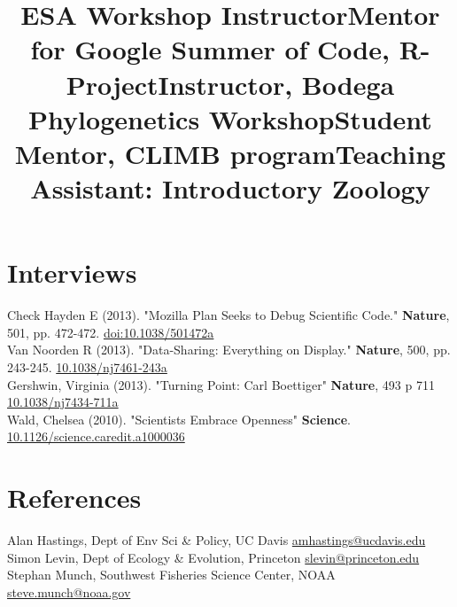 \documentclass[margin]{res}
\begin{document}
\begin{resume}
\title{ESA Workshop Instructor}
\begin{position} \vspace{-.8cm} \end{position}
\title{Mentor for Google Summer of Code, R-Project}
\begin{position} \vspace{-.8cm} \end{position}
\title{Instructor, Bodega Phylogenetics Workshop}
\begin{position} \vspace{-.8cm} \end{position}
\title{Student Mentor, CLIMB program}
\begin{position} \vspace{-.8cm} \end{position}
\title{Teaching Assistant: Introductory Zoology}
 \begin{position} \vspace{-.0cm} \end{position}




\section{Interviews}

Check Hayden E (2013). "Mozilla Plan Seeks to Debug Scientific Code." \textbf{Nature}, 501, pp. 472-472. \href{http://doi.org/10.1038/501472a}{doi:10.1038/501472a} \\ 
Van Noorden R (2013). "Data-Sharing: Everything on Display." \textbf{Nature}, 500, pp. 243-245. \href{http://doi.org/10.1038/nj7461-243a}{10.1038/nj7461-243a} \\
Gershwin, Virginia (2013). "Turning Point: Carl Boettiger" \textbf{Nature}, 493 p 711 \href{http://doi.org/10.1038/nj7434-711a}{10.1038/nj7434-711a} \\
Wald, Chelsea (2010). "Scientists Embrace Openness" \textbf{Science}. \href{http://doi.org/10.1126/science.caredit.a1000036}{10.1126/science.caredit.a1000036} 

\section{References}

Alan Hastings, Dept of Env Sci \& Policy, UC Davis \href{mailto:amhastings@ucdavis.edu}{amhastings@ucdavis.edu} \\ 
Simon Levin, Dept of Ecology \& Evolution, Princeton \href{mailto:slevin@princeton.edu}{slevin@princeton.edu} \\
Stephan Munch, Southwest Fisheries Science Center, NOAA \href{mailto:steve.munch@noaa.gov}{steve.munch@noaa.gov} \\


\end{resume}
\end{document}
